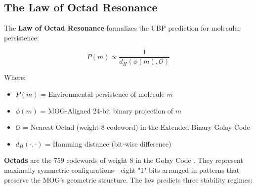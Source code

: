 \documentclass[11pt,letterpaper]{article}
\begin{document}
\subsection{The Law of Octad Resonance}

The \textbf{Law of Octad Resonance} formalizes the UBP prediction for molecular persistence:

\begin{equation}
P(m) \propto \frac{1}{d_H(\phi(m), \mathcal{O})}
\label{eq:octad_law}
\end{equation}

Where:
\begin{itemize}
    \item $P(m)$ = Environmental persistence of molecule $m$
    \item $\phi(m)$ = MOG-Aligned 24-bit binary projection of $m$
    \item $\mathcal{O}$ = Nearest Octad (weight-8 codeword) in the Extended Binary Golay Code
    \item $d_H(\cdot, \cdot)$ = Hamming distance (bit-wise difference)
\end{itemize}

\textbf{Octads} are the 759 codewords of weight 8 in the Golay Code \cite{Curtis1976MOG}. They represent maximally symmetric configurations—eight "1" bits arranged in patterns that preserve the MOG's geometric structure. The law predicts three stability regimes:
\end{document}
